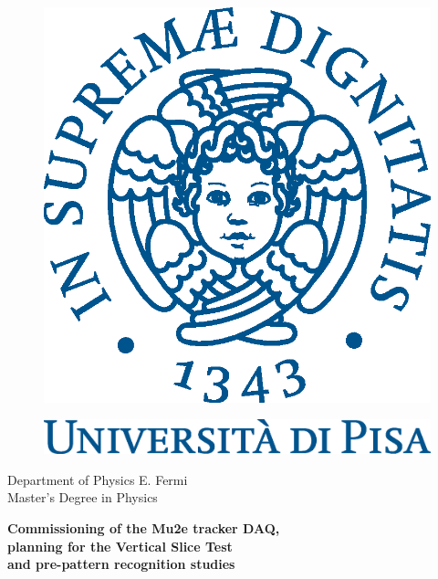 \begin{titlepage}
    \begin{center}
\begin{figure}[!htb]
    \centering
    \includegraphics[keepaspectratio=true,scale=0.4]{figures/eps/cherubinFrontespizio.eps}
\end{figure}
\begin{figure}[!htb]
    \centering
    \includegraphics[keepaspectratio=true,scale=0.45]{figures/eps/logo_pant541.eps}
\end{figure}

    \Large{Department of Physics E. Fermi}
    \vspace{5mm}
    \\ 
    \Large{Master's Degree in Physics}
\end{center}

\vspace{15mm}
\begin{center}
  {\LARGE{\bf Commissioning of the Mu2e tracker DAQ,\\\vspace{3mm}planning for the Vertical Slice Test\\\vspace{5mm}and pre-pattern recognition studies}}
\end{center}
\vspace{25mm}


\end{titlepage}
